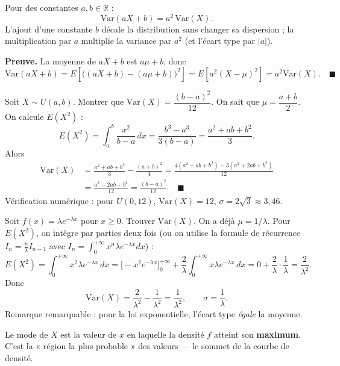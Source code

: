 \documentclass[11pt]{article}
\newcommand{\cle}[1]{{\popxbold\color{popdark}#1}}
\newcounter{popsec}
\newcounter{popsub}
\newcommand{\courssub}[1]{%
  \stepcounter{popsub}%
  \par\vspace{9pt}\noindent{\popxbold\fontsize{11.5}{13}\selectfont\color{popink}{\color{poporange}\thepopsec.\thepopsub}\hspace{6pt}#1}\par\nopagebreak\vspace{4pt}
}
\begin{document}
\begin{propriete}
Pour des constantes $a,b\in\mathbb{R}$ :
\[ \mathrm{Var}(aX+b)=a^2\,\mathrm{Var}(X). \]
L'ajout d'une constante $b$ décale la distribution sans changer sa dispersion ; la multiplication par $a$ multiplie la variance par $a^2$ (et l'écart type par $|a|$).
\end{propriete}

\textbf{Preuve.} La moyenne de $aX+b$ est $a\mu+b$, donc
\[ \mathrm{Var}(aX+b)=E\!\left[\big((aX+b)-(a\mu+b)\big)^2\right]=E\!\left[a^2(X-\mu)^2\right]=a^2\mathrm{Var}(X). \quad\blacksquare \]

\begin{exoresolu}
Soit $X\sim U(a,b)$. Montrer que $\mathrm{Var}(X)=\dfrac{(b-a)^2}{12}$.
\tcblower
On sait que $\mu=\dfrac{a+b}{2}$. On calcule $E(X^2)$ :
\[ E(X^2)=\int_a^b \frac{x^2}{b-a}\,dx=\frac{b^3-a^3}{3(b-a)}=\frac{a^2+ab+b^2}{3}. \]
Alors
\begin{align*}
\mathrm{Var}(X)&=\frac{a^2+ab+b^2}{3}-\frac{(a+b)^2}{4}=\frac{4(a^2+ab+b^2)-3(a^2+2ab+b^2)}{12}\\
&=\frac{a^2-2ab+b^2}{12}=\frac{(b-a)^2}{12}. \quad\blacksquare
\end{align*}
Vérification numérique : pour $U(0,12)$, $\mathrm{Var}(X)=12$, $\sigma=2\sqrt{3}\approx 3,46$.
\end{exoresolu}

\begin{exoresolu}
Soit $f(x)=\lambda e^{-\lambda x}$ pour $x\ge 0$. Trouver $\mathrm{Var}(X)$.
\tcblower
On a déjà $\mu=1/\lambda$. Pour $E(X^2)$, on intègre par parties deux fois (ou on utilise la formule de récurrence $I_n=\frac{n}{\lambda}I_{n-1}$ avec $I_n=\int_0^{+\infty}x^n\lambda e^{-\lambda x}dx$) :
\[ E(X^2)=\int_0^{+\infty} x^2\lambda e^{-\lambda x}\,dx=\Big[-x^2e^{-\lambda x}\Big]_0^{+\infty}+\frac{2}{\lambda}\int_0^{+\infty} x\lambda e^{-\lambda x}\,dx=0+\frac{2}{\lambda}\cdot\frac{1}{\lambda}=\frac{2}{\lambda^2}. \]
Donc
\[ \mathrm{Var}(X)=\frac{2}{\lambda^2}-\frac{1}{\lambda^2}=\frac{1}{\lambda^2}, \qquad \sigma=\frac{1}{\lambda}. \]
Remarque remarquable : pour la loi exponentielle, l'écart type \emph{égale} la moyenne.
\end{exoresolu}

\courssub{Le mode}

\begin{definition}
Le \cle{mode} de $X$ est la valeur de $x$ en laquelle la densité $f$ atteint son \textbf{maximum}. C'est la « région la plus probable » des valeurs — le sommet de la courbe de densité.
\end{definition}
\end{document}
